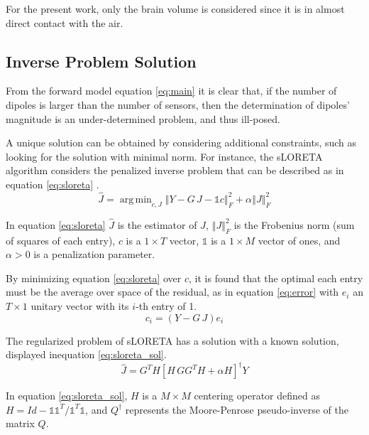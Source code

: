 \documentclass[draftcls, onecolumn, peerreview]{IEEEtran}
\DeclareMathOperator*{\argmin}{arg\,min}
\begin{document}
For the present work, only the brain volume is considered since it is in almost direct contact with the air. 


\subsection{Inverse Problem Solution}

From the forward model equation \eqref{eq:main} it is clear that, if the number of dipoles is larger than the number of sensors, then the determination of dipoles' magnitude is an under-determined problem, and thus ill-posed.

A unique solution can be obtained by considering additional constraints, such as looking for the solution with minimal norm.
%
For instance, the sLORETA algorithm considers the penalized inverse problem that can be described as in equation \eqref{eq:sloreta} \cite{sloreta}.
\begin{equation}
    \hat{J} = \argmin_{c,J} \left\Vert Y - G\, J - \mathbb{1} c \right\Vert_F^2 + \alpha \left\Vert J \right\Vert_F^2
    \label{eq:sloreta}
\end{equation}

In equation \eqref{eq:sloreta} $\hat{J}$ is the estimator of $J$,
$\left\Vert J \right\Vert_F^2$ is the Frobenius norm (sum of squares of each entry),
$c$ is a $1\times T$ vector, $\mathbb{1}$ is a $1\times M$ vector of ones, and $\alpha>0$ is a penalization parameter.

By minimizing equation \eqref{eq:sloreta} over $c$, it is found that the optimal each entry must be the average over space of the residual, as in equation \eqref{eq:error} with $e_i$ an $T\times 1$ unitary vector with its $i$-th entry of 1.
\begin{equation}
    c_i = (Y-G\, J) e_i
    \label{eq:error}
\end{equation}

The regularized problem of sLORETA has a solution with a known solution, displayed inequation \eqref{eq:sloreta_sol}.
\begin{equation}
    \hat{J} = {G}^T H \left[ H\, {G} {G}^T H + \alpha H \right]^\dagger Y
    \label{eq:sloreta_sol}
\end{equation}

In equation \eqref{eq:sloreta_sol}, $H$ is a $M\times M$ centering operator defined as 
$H = Id - \mathbb{1} \mathbb{1}^T / \mathbb{1}^T \mathbb{1}$, and $Q^\dagger$ represents the Moore-Penrose pseudo-inverse of the matrix $Q$.
\end{document}

